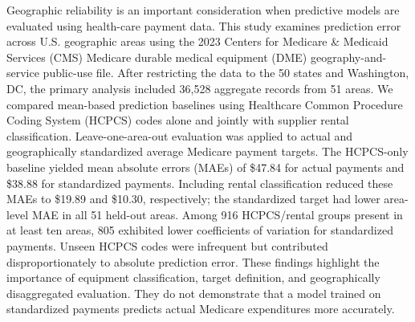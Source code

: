 Geographic reliability is an important consideration when predictive models are evaluated using health-care payment data. This study examines prediction error across U.S. geographic areas using the 2023 Centers for Medicare \& Medicaid Services (CMS) Medicare durable medical equipment (DME) geography-and-service public-use file. After restricting the data to the 50 states and Washington, DC, the primary analysis included 36,528 aggregate records from 51 areas. We compared mean-based prediction baselines using Healthcare Common Procedure Coding System (HCPCS) codes alone and jointly with supplier rental classification. Leave-one-area-out evaluation was applied to actual and geographically standardized average Medicare payment targets. The HCPCS-only baseline yielded mean absolute errors (MAEs) of \$47.84 for actual payments and \$38.88 for standardized payments. Including rental classification reduced these MAEs to \$19.89 and \$10.30, respectively; the standardized target had lower area-level MAE in all 51 held-out areas. Among 916 HCPCS/rental groups present in at least ten areas, 805 exhibited lower coefficients of variation for standardized payments. Unseen HCPCS codes were infrequent but contributed disproportionately to absolute prediction error. These findings highlight the importance of equipment classification, target definition, and geographically disaggregated evaluation. They do not demonstrate that a model trained on standardized payments predicts actual Medicare expenditures more accurately.
